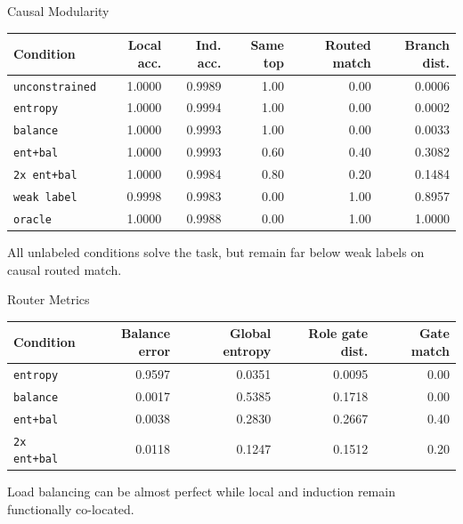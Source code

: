 \documentclass[aspectratio=169]{beamer}
\begin{document}
\begin{frame}{Causal Modularity}
  \begin{center}
  \scriptsize
  \begin{tabular}{lrrrrr}
    \toprule
    Condition & Local acc. & Ind. acc. & Same top & Routed match & Branch dist. \\
    \midrule
    \texttt{unconstrained} & 1.0000 & 0.9989 & 1.00 & 0.00 & 0.0006 \\
    \texttt{entropy} & 1.0000 & 0.9994 & 1.00 & 0.00 & 0.0002 \\
    \texttt{balance} & 1.0000 & 0.9993 & 1.00 & 0.00 & 0.0033 \\
    \texttt{ent+bal} & 1.0000 & 0.9993 & 0.60 & 0.40 & 0.3082 \\
    \texttt{2x ent+bal} & 1.0000 & 0.9984 & 0.80 & 0.20 & 0.1484 \\
    \texttt{weak label} & 0.9998 & 0.9983 & 0.00 & 1.00 & 0.8957 \\
    \texttt{oracle} & 1.0000 & 0.9988 & 0.00 & 1.00 & 1.0000 \\
    \bottomrule
  \end{tabular}
  \end{center}

  \vspace{0.5em}
  All unlabeled conditions solve the task, but remain far below weak labels on
  causal routed match.
\end{frame}

\begin{frame}{Router Metrics}
  \begin{center}
  \scriptsize
  \begin{tabular}{lrrrr}
    \toprule
    Condition & Balance error & Global entropy & Role gate dist. & Gate match \\
    \midrule
    \texttt{entropy} & 0.9597 & 0.0351 & 0.0095 & 0.00 \\
    \texttt{balance} & 0.0017 & 0.5385 & 0.1718 & 0.00 \\
    \texttt{ent+bal} & 0.0038 & 0.2830 & 0.2667 & 0.40 \\
    \texttt{2x ent+bal} & 0.0118 & 0.1247 & 0.1512 & 0.20 \\
    \bottomrule
  \end{tabular}
  \end{center}

  \vspace{0.7em}
  Load balancing can be almost perfect while local and induction remain
  functionally co-located.
\end{frame}
\end{document}
